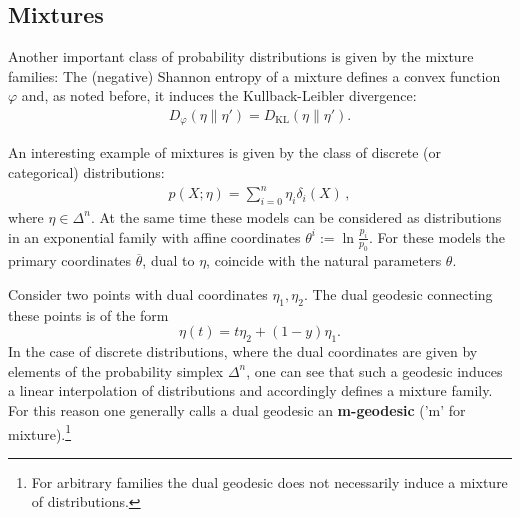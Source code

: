 \subsection{Mixtures}

    Another important class of probability distributions is given by the mixture families:
    The (negative) Shannon entropy of a mixture defines a convex function $\varphi$ and, as noted before, it induces the Kullback-Leibler divergence:
    \begin{gather}
        D_\varphi(\eta\|\eta') = D_\mathrm{KL}(\eta\|\eta').
    \end{gather}

    \begin{example}
        An interesting example of mixtures is given by the class of discrete (or categorical) distributions:
        \begin{gather}
            p(X;\eta) = \sum_{i=0}^n\eta_i\delta_i(X)\,,
        \end{gather}
        where $\eta\in\Delta^n$. At the same time these models can be considered as distributions in an exponential family with affine coordinates $\theta^i:=\ln\frac{p_i}{p_0}$. For these models the primary coordinates $\overline{\theta}$, dual to $\eta$, coincide with the natural parameters $\theta$.
    \end{example}

    Consider two points with dual coordinates $\eta_1,\eta_2$. The dual geodesic connecting these points is of the form \[\eta(t) = t\eta_2 + (1-y)\eta_1.\] In the case of discrete distributions, where the dual coordinates are given by elements of the probability simplex $\Delta^n$, one can see that such a geodesic induces a linear interpolation of distributions and accordingly defines a mixture family. For this reason one generally calls a dual geodesic an \textbf{m-geodesic} ('m' for mixture).\footnote{For arbitrary families the dual geodesic does not necessarily induce a mixture of distributions.}

